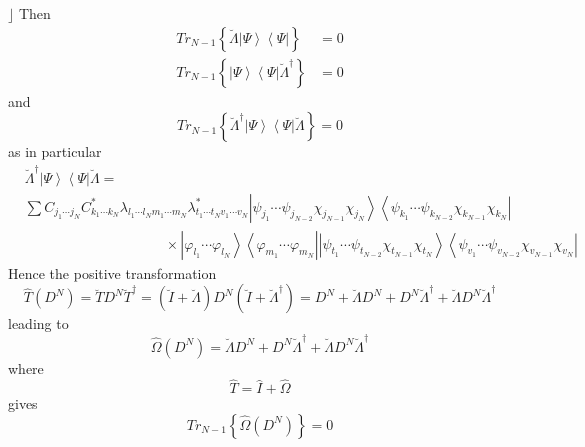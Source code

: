 \documentclass[aps,preprint]{revtex4}%
\begin{document}
$\rfloor$ Then
\begin{align}
Tr_{N-1}\left\{  \breve{\Lambda}\left\vert \Psi\right\rangle \left\langle
\Psi\right\vert \right\}   &  =0\nonumber\\
Tr_{N-1}\left\{  \left\vert \Psi\right\rangle \left\langle \Psi\right\vert
\breve{\Lambda}^{\dagger}\right\}   &  =0
\end{align}
and
\begin{equation}
Tr_{N-1}\left\{  \breve{\Lambda}^{\dagger}\left\vert \Psi\right\rangle
\left\langle \Psi\right\vert \breve{\Lambda}\right\}  =0
\end{equation}
as in particular
\begin{align}
&  \breve{\Lambda}^{\dagger}\left\vert \Psi\right\rangle \left\langle
\Psi\right\vert \breve{\Lambda}=\\
&  \sum C_{j_{1}\cdots j_{N}}C_{k_{1}\cdots k_{N}}^{\ast}\lambda_{l_{1}\cdots
l_{N}m_{1}\cdots m_{N}}\lambda_{t_{1}\cdots t_{N}v_{1}\cdots v_{N}}^{\ast
}\left\vert \psi_{j_{1}}\cdots\psi_{j_{N-2}}\chi_{j_{N-1}}\chi_{j_{N}%
}\right\rangle \left\langle \psi_{k_{1}}\cdots\psi_{k_{N-2}}\chi_{k_{N-1}}%
\chi_{k_{N}}\right\vert \\
&  \qquad\qquad\qquad\qquad\qquad\times\left\vert \varphi_{l_{1}}\cdots
\varphi_{l_{N}}\right\rangle \left\langle \varphi_{m_{1}}\cdots\varphi_{m_{N}%
}\right\vert \left\vert \psi_{t_{1}}\cdots\psi_{t_{N-2}}\chi_{t_{N-1}}%
\chi_{t_{N}}\right\rangle \left\langle \psi_{v_{1}}\cdots\psi_{v_{N-2}}%
\chi_{v_{N-1}}\chi_{v_{N}}\right\vert
\end{align}
Hence the positive transformation
\begin{equation}
\hat{T}\left(  D^{N}\right)  =\breve{T}D^{N}\breve{T}^{\dagger}=\left(
\breve{I}+\breve{\Lambda}\right)  D^{N}\left(  \breve{I}+\breve{\Lambda
}^{\dagger}\right)  =D^{N}+\breve{\Lambda}D^{N}+D^{N}\breve{\Lambda}^{\dagger
}+\breve{\Lambda}D^{N}\breve{\Lambda}^{\dagger}%
\end{equation}
leading to
\begin{equation}
\hat{\Omega}\left(  D^{N}\right)  =\breve{\Lambda}D^{N}+D^{N}\breve{\Lambda
}^{\dagger}+\breve{\Lambda}D^{N}\breve{\Lambda}^{\dagger}%
\end{equation}
where
\begin{equation}
\hat{T}=\hat{I}+\hat{\Omega}%
\end{equation}
gives
\begin{equation}
Tr_{N-1}\left\{  \hat{\Omega}\left(  D^{N}\right)  \right\}  =0
\end{equation}
\end{document}

